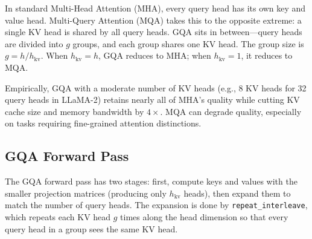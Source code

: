 In standard Multi-Head Attention (MHA), every query head has its own key and
value head. Multi-Query Attention (MQA) takes this to the opposite extreme:
a single KV head is shared by all query heads. GQA sits in between---query
heads are divided into $g$ groups, and each group shares one KV head. The
group size is $g = h / h_{\text{kv}}$. When $h_{\text{kv}} = h$, GQA reduces
to MHA; when $h_{\text{kv}} = 1$, it reduces to MQA.

Empirically, GQA with a moderate number of KV heads (e.g., 8 KV heads for 32
query heads in LLaMA-2) retains nearly all of MHA's quality while cutting KV
cache size and memory bandwidth by $4\times$. MQA can degrade quality,
especially on tasks requiring fine-grained attention distinctions.

\subsection{GQA Forward Pass}

The GQA forward pass has two stages: first, compute keys and values with the
smaller projection matrices (producing only $h_{\text{kv}}$ heads), then
expand them to match the number of query heads. The expansion is done by
\texttt{repeat\_interleave}, which repeats each KV head $g$ times along the
head dimension so that every query head in a group sees the same KV head.

